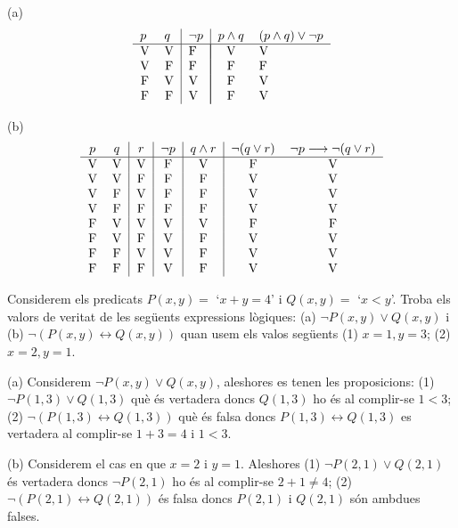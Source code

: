 \begin{solucio}
(a)%
\[%
\begin{tabular}
[c]{ll|l|ll}%
$p$ & $q$ & $\lnot p$ & $p\wedge q$ & $(p\wedge q)\vee\lnot p$\\\hline
\multicolumn{1}{c}{V} & \multicolumn{1}{c|}{V} & F & \multicolumn{1}{|c}{V} &
V\\
\multicolumn{1}{c}{V} & \multicolumn{1}{c|}{F} & F & \multicolumn{1}{|c}{F} &
F\\
\multicolumn{1}{c}{F} & \multicolumn{1}{c|}{V} & V & \multicolumn{1}{|c}{F} &
V\\
\multicolumn{1}{c}{F} & \multicolumn{1}{c|}{F} & V & \multicolumn{1}{|c}{F} &
V
\end{tabular}
\]


(b)%
\[%
\begin{tabular}
[c]{cc|c|c|c|cc}%
$p$ & $q$ & $r$ & $\lnot p$ & $q\wedge r$ & $\lnot(q\vee r)$ & $\lnot
p\longrightarrow\lnot(q\vee r)$\\\hline
V & V & V & F & V & F & V\\
V & V & F & F & F & V & V\\
V & F & V & F & F & V & V\\
V & F & F & F & F & V & V\\
F & V & V & V & V & F & F\\
F & V & F & V & F & V & V\\
F & F & V & V & F & V & V\\
F & F & F & V & F & V & V
\end{tabular}
\]

\end{solucio}

\begin{exercici}
Considerem els predicats $P(x,y)=$ `$x+y=4$' i $Q(x,y)=$ `$x<y$'. Troba els
valors de veritat de les seg\"{u}ents expressions l\`{o}giques: (a) $\lnot
P(x,y)\vee Q(x,y)$ i (b) $\lnot(P(x,y)\longleftrightarrow Q(x,y))$ quan usem
els valos seg\"{u}ents (1) $x=1,y=3$; (2) $x=2,y=1$.
\end{exercici}

\begin{solucio}
(a) Considerem $\lnot P(x,y)\vee Q(x,y)$, aleshores es tenen les proposicions:
(1) $\lnot P(1,3)\vee Q(1,3)$ qu\`{e} \'{e}s vertadera doncs $Q(1,3)$ ho
\'{e}s al complir-se $1<3$; (2) $\lnot(P(1,3)\longleftrightarrow Q(1,3))$
qu\`{e} \'{e}s falsa doncs $P(1,3)\longleftrightarrow Q(1,3)$ es vertadera al
complir-se $1+3=4$ i $1<3$.

(b) Considerem el cas en que $x=2$ i $y=1$. Aleshores (1) $\lnot P(2,1)\vee
Q(2,1)$ \'{e}s vertadera doncs $\lnot P(2,1)$ ho \'{e}s al complir-se
$2+1\neq4$; (2) $\lnot(P(2,1)\longleftrightarrow Q(2,1))$ \'{e}s falsa doncs
$P(2,1)$ i $Q(2,1)$ s\'{o}n ambdues falses.
\end{solucio}

